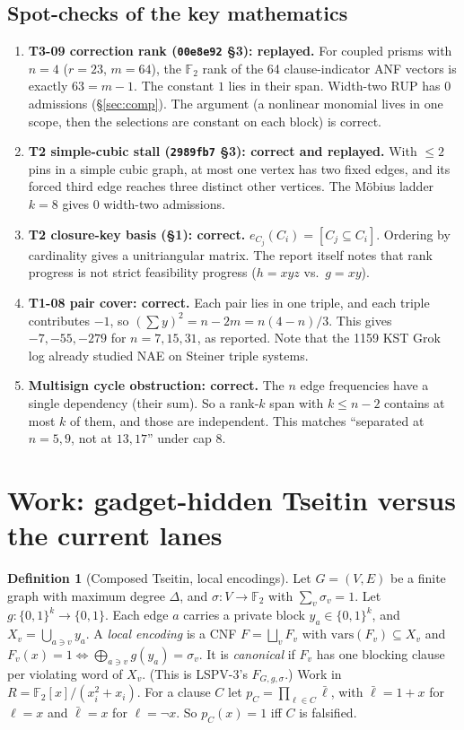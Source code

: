 \documentclass[11pt]{article}
\theoremstyle{definition}
\newtheorem{definition}{Definition}
\theoremstyle{remark}
\newcommand{\F}{\mathbb{F}}
\begin{document}
\subsection{Spot-checks of the key mathematics}\label{sec:spot}
\begin{enumerate}
\item \textbf{T3-09 correction rank (\texttt{00e8e92} \S3): replayed.} For coupled prisms with
$n=4$ ($r=23$, $m=64$), the $\F_2$ rank of the 64 clause-indicator ANF vectors is exactly
$63=m-1$. The constant $1$ lies in their span. Width-two RUP has 0 admissions
(\S\ref{sec:comp}). The argument (a nonlinear monomial lives in one scope, then the selections
are constant on each block) is correct.
\item \textbf{T2 simple-cubic stall (\texttt{2989fb7} \S3): correct and replayed.} With
$\le2$ pins in a simple cubic graph, at most one vertex has two fixed edges, and its forced
third edge reaches three distinct other vertices. The Möbius ladder $k=8$ gives 0 width-two
admissions.
\item \textbf{T2 closure-key basis (\S1): correct.} $e_{C_j}(C_i)=[C_j\subseteq C_i]$. Ordering
by cardinality gives a unitriangular matrix. The report itself notes that rank progress is not
strict feasibility progress ($h=xyz$ vs.\ $g=xy$).
\item \textbf{T1-08 pair cover: correct.} Each pair lies in one triple, and each triple
contributes $-1$, so $(\sum y)^2=n-2m=n(4-n)/3$. This gives $-7,-55,-279$ for $n=7,15,31$, as
reported. Note that the 1159 KST Grok log already studied NAE on Steiner triple systems.
\item \textbf{Multisign cycle obstruction: correct.} The $n$ edge frequencies have a single
dependency (their sum). So a rank-$k$ span with $k\le n-2$ contains at most $k$ of them, and
those are independent. This matches ``separated at $n=5,9$, not at $13,17$'' under cap $8$.
\end{enumerate}

\section{Work: gadget-hidden Tseitin versus the current lanes}\label{sec:work}
\begin{definition}[Composed Tseitin, local encodings]
Let $G=(V,E)$ be a finite graph with maximum degree $\Delta$, and $\sigma:V\to\F_2$ with
$\sum_v\sigma_v=1$. Let $g:\{0,1\}^k\to\{0,1\}$. Each edge $a$ carries a private block
$y_a\in\{0,1\}^k$, and $X_v=\bigcup_{a\ni v}y_a$. A \emph{local encoding} is a CNF
$F=\bigsqcup_vF_v$ with $\mathrm{vars}(F_v)\subseteq X_v$ and
$F_v(x)=1\iff\bigoplus_{a\ni v}g(y_a)=\sigma_v$. It is \emph{canonical} if $F_v$ has one
blocking clause per violating word of $X_v$. (This is LSPV-3's $F_{G,g,\sigma}$.) Work in
$R=\F_2[x]/(x_i^2+x_i)$. For a clause $C$ let $p_C=\prod_{\ell\in C}\bar\ell$, with
$\bar\ell=1+x$ for $\ell=x$ and $\bar\ell=x$ for $\ell=\neg x$. So $p_C(x)=1$ iff $C$ is
falsified.
\end{definition}
\end{document}
